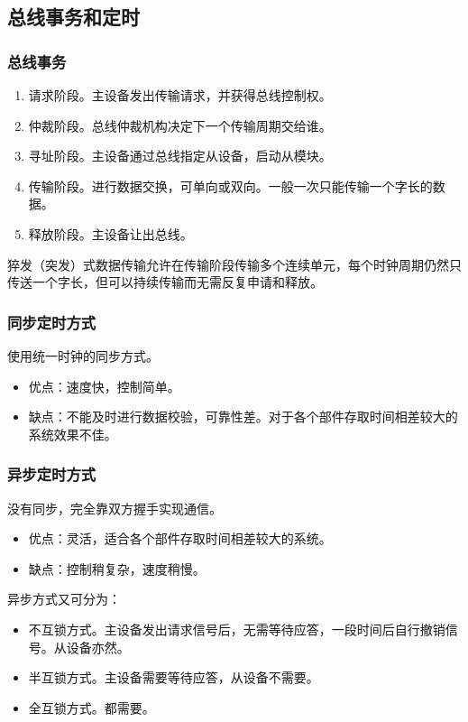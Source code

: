 \documentclass[12pt, a4paper, oneside]{ctexart}
\begin{document}
\subsection{总线事务和定时}

\subsubsection{总线事务}

\begin{enumerate}
  \item 请求阶段。主设备发出传输请求，并获得总线控制权。
  \item 仲裁阶段。总线仲裁机构决定下一个传输周期交给谁。
  \item 寻址阶段。主设备通过总线指定从设备，启动从模块。
  \item 传输阶段。进行数据交换，可单向或双向。一般一次只能传输一个字长的数据。
  \item 释放阶段。主设备让出总线。
\end{enumerate}

猝发（突发）式数据传输允许在传输阶段传输多个连续单元，每个时钟周期仍然只传送一个字长，但可以持续传输而无需反复申请和释放。

\subsubsection{同步定时方式}

使用统一时钟的同步方式。

\begin{itemize}
  \item 优点：速度快，控制简单。
  \item 缺点：不能及时进行数据校验，可靠性差。对于各个部件存取时间相差较大的系统效果不佳。
\end{itemize}

\subsubsection{异步定时方式}

没有同步，完全靠双方握手实现通信。

\begin{itemize}
  \item 优点：灵活，适合各个部件存取时间相差较大的系统。
  \item 缺点：控制稍复杂，速度稍慢。
\end{itemize}

异步方式又可分为：
\begin{itemize}
  \item 不互锁方式。主设备发出请求信号后，无需等待应答，一段时间后自行撤销信号。从设备亦然。
  \item 半互锁方式。主设备需要等待应答，从设备不需要。
  \item 全互锁方式。都需要。
\end{itemize}
\end{document}
